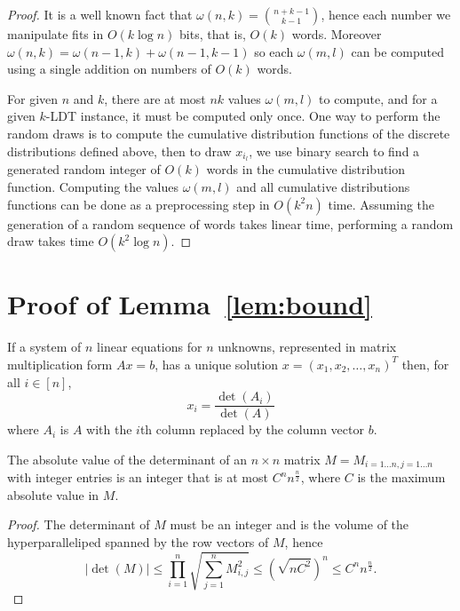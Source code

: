 \begin{proof}
	It is a well known fact that $\omega(n,k)=\binom{n+k-1}{k-1}$, hence each
	number we manipulate fits in $O(k \log n)$ bits, that is, $O(k)$ words.
	Moreover $\omega(n,k) = \omega(n-1,k) + \omega(n-1,k-1)$ so each
	$\omega(m,l)$ can be computed using a single addition on numbers of $O(k)$
	words.

	For given $n$ and $k$, there are at most $nk$ values $\omega(m,l)$ to
	compute, and for a given $k$-LDT instance, it must be computed only once.
	One way to perform the random draws is to compute the cumulative
	distribution functions of the discrete distributions defined above, then to
	draw $x_{i_l}$, we use binary search to find a generated random integer of
	$O(k)$ words in the cumulative distribution function. Computing the
	values $\omega(m,l)$ and all cumulative distributions functions can be done
	as a preprocessing step in $O(k^2 n)$ time. Assuming the generation
	of a random sequence of words takes linear time, performing a random draw
	takes time $O(k^2 \log n)$.

\end{proof}

\section{Proof of Lemma~\ref*{lem:bound}}
\label{app:bound}

\begin{theorem}\label{thm:cramer}
	If a system of $n$ linear equations for $n$ unknowns, represented in matrix
	multiplication form $Ax=b$,
	has a unique solution $x=(x_1,x_2,\ldots,x_n)^T$ then, for all $i \in [n]$,
	$$
		x_i = \frac{\det(A_i)}{\det(A)}
	$$
	where $A_i$ is $A$ with the $i$th column replaced by the column vector $b$.
\end{theorem}

\begin{lemma}\label{lem:detZ}
	The absolute value of the determinant of an $n\times n$ matrix $M =
	M_{i=1\ldots n,j=1\ldots n}$ with integer entries is an integer that is at
	most $C^n n^{\frac n2}$, where $C$ is the maximum absolute value in $M$.
\end{lemma}
\begin{proof}
	The determinant of $M$ must be an integer
	and is the volume of the
	hyperparalleliped spanned by the row vectors of $M$, hence
	$$
	|\det(M)| \le \prod_{i=1}^n \sqrt{\sum_{j=1}^{n} M_{i,j}^2} \le {(\sqrt{n C^2})}^{n} \le C^n n^\frac n2.
	$$
\end{proof}

